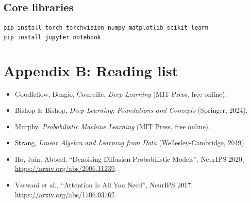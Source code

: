 \documentclass[12pt,a4paper,twoside]{book}
\begin{document}
\section*{Core libraries}
\begin{verbatim}
pip install torch torchvision numpy matplotlib scikit-learn
pip install jupyter notebook
\end{verbatim}

\chapter*{Appendix B: Reading list}

\begin{itemize}
  \item Goodfellow, Bengio, Courville, \emph{Deep Learning} (MIT Press, free online).
  \item Bishop \& Bishop, \emph{Deep Learning: Foundations and Concepts} (Springer, 2024).
  \item Murphy, \emph{Probabilistic Machine Learning} (MIT Press, free online).
  \item Strang, \emph{Linear Algebra and Learning from Data} (Wellesley-Cambridge, 2019).
  \item Ho, Jain, Abbeel, ``Denoising Diffusion Probabilistic Models'', NeurIPS 2020, \url{https://arxiv.org/abs/2006.11239}.
  \item Vaswani et al., ``Attention Is All You Need'', NeurIPS 2017, \url{https://arxiv.org/abs/1706.03762}.
\end{itemize}
\end{document}
